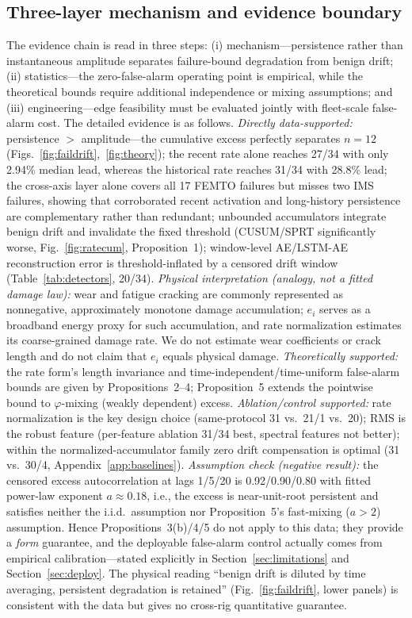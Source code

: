 \documentclass[journal]{IEEEtran}
\begin{document}
\subsection{Three-layer mechanism and evidence boundary}
The evidence chain is read in three steps: (i) mechanism---persistence rather than instantaneous amplitude separates failure-bound degradation from benign drift; (ii) statistics---the zero-false-alarm operating point is empirical, while the theoretical bounds require additional independence or mixing assumptions; and (iii) engineering---edge feasibility must be evaluated jointly with fleet-scale false-alarm cost. The detailed evidence is as follows.
\emph{Directly data-supported:} persistence $>$ amplitude---the cumulative excess perfectly separates $n=12$ (Figs.~\ref{fig:faildrift},~\ref{fig:theory}); the recent rate alone reaches 27/34 with only 2.94\% median lead, whereas the historical rate reaches 31/34 with 28.8\% lead; the cross-axis layer alone covers all 17 FEMTO failures but misses two IMS failures, showing that corroborated recent activation and long-history persistence are complementary rather than redundant; unbounded accumulators integrate benign drift and invalidate the fixed threshold (CUSUM/SPRT significantly worse, Fig.~\ref{fig:ratecum}, Proposition~1); window-level AE/LSTM-AE reconstruction error is threshold-inflated by a censored drift window (Table~\ref{tab:detectors}, 20/34). \emph{Physical interpretation (analogy, not a fitted damage law):} wear and fatigue cracking are commonly represented as nonnegative, approximately monotone damage accumulation; $e_i$ serves as a broadband energy proxy for such accumulation, and rate normalization estimates its coarse-grained damage rate. We do not estimate wear coefficients or crack length and do not claim that $e_i$ equals physical damage. \emph{Theoretically supported:} the rate form's length invariance and time-independent/time-uniform false-alarm bounds are given by Propositions~2--4; Proposition~5 extends the pointwise bound to $\varphi$-mixing (weakly dependent) excess. \emph{Ablation/control supported:} rate normalization is the key design choice (same-protocol 31 vs.\ 21/1 vs.\ 20); RMS is the robust feature (per-feature ablation 31/34 best, spectral features not better); within the normalized-accumulator family zero drift compensation is optimal (31 vs.\ 30/4, Appendix~\ref{app:baselines}). \emph{Assumption check (negative result):} the censored excess autocorrelation at lags 1/5/20 is 0.92/0.90/0.80 with fitted power-law exponent $a\approx0.18$, i.e., the excess is near-unit-root persistent and satisfies neither the i.i.d.\ assumption nor Proposition~5's fast-mixing ($a>2$) assumption. Hence Propositions~3(b)/4/5 do not apply to this data; they provide a \emph{form} guarantee, and the deployable false-alarm control actually comes from empirical calibration---stated explicitly in Section~\ref{sec:limitations} and Section~\ref{sec:deploy}. The physical reading ``benign drift is diluted by time averaging, persistent degradation is retained'' (Fig.~\ref{fig:faildrift}, lower panels) is consistent with the data but gives no cross-rig quantitative guarantee.
\end{document}
